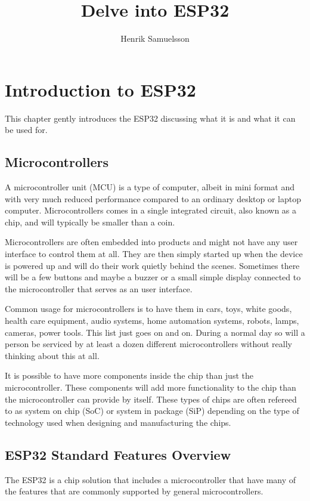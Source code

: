 \documentclass{tufte-book}
\title{Delve into ESP32}
\author{Henrik Samuelsson}
\begin{document}
\maketitle

\cleardoublepage

\tableofcontents

\chapter{Introduction to ESP32}
This chapter gently introduces the ESP32 discussing what it is and what it can 
be used for.

\section{Microcontrollers}
A microcontroller unit (MCU) is a type of computer, albeit in mini format and 
with very much reduced performance compared to an ordinary desktop or laptop 
computer. Microcontrollers comes in a single integrated circuit, also known as 
a chip, and will typically be smaller than a coin.

Microcontrollers are often embedded into products and might not have 
any user interface to control them at all. They are then simply started up when 
the device is powered up and will do their work quietly behind the scenes. 
Sometimes there will be a few buttons and maybe a buzzer or a small simple 
display connected to the microcontroller that serves as an user interface.

Common usage for microcontrollers is to have them in cars, toys, white goods, 
health care equipment, audio systems, home automation systems, robots, lamps, 
cameras, power tools. This list just goes on and on. During a normal day so 
will a person be serviced by at least a dozen different microcontrollers 
without really thinking about this at all.

It is possible to have more components inside the chip than just the 
microcontroller. These components will add more functionality to the chip than 
the microcontroller can provide by itself. These types of chips are often 
refereed to as system on chip (SoC) or system in package (SiP) depending on 
the type of technology used when designing and manufacturing the chips.
  
\section{ESP32 Standard Features Overview}
The ESP32 is a chip solution that includes a microcontroller that have many of 
the features that are commonly supported by general microcontrollers.
\end{document}
